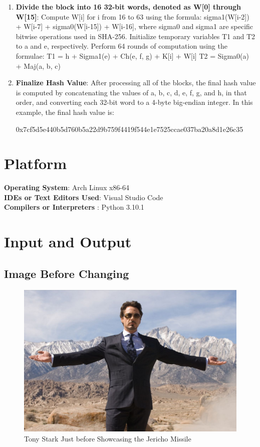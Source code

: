 \documentclass[openany]{book}
\begin{document}
\begin{enumerate}
    \item \textbf{Divide the block into 16 32-bit words, denoted as W[0] through W[15]}:
          Compute W[i] for i from 16 to 63 using the formula: sigma1(W[i-2]) + W[i-7] + sigma0(W[i-15]) + W[i-16], where sigma0 and sigma1 are specific bitwise operations used in SHA-256.
          Initialize temporary variables T1 and T2 to a and e, respectively.
          Perform 64 rounds of computation using the formulae:
          T1 = h + Sigma1(e) + Ch(e, f, g) + K[i] + W[i]
          T2 = Sigma0(a) + Maj(a, b, c)

    \item \textbf{Finalize Hash Value}: After processing all of the blocks, the final hash value is computed by concatenating the values of a, b, c, d, e, f, g, and h, in that order, and converting each 32-bit word to a 4-byte big-endian integer. In this example, the final hash value is:

          0x7cf5d5e440b5d760b5a22d9b759f4419f544e1e7525ccae037ba20a8d1e26c35
\end{enumerate}


\section{Platform}
\textbf{\textbf{Operating System}}: Arch Linux x86-64 \\
\textbf{\textbf{IDEs or Text Editors Used}}: Visual Studio Code\\
\textbf{\textbf{Compilers or Interpreters} }: Python 3.10.1\\

\section{Input and Output}

\subsection*{Image Before Changing}
\begin{figure}[H]
    \centering
    \includegraphics[width=.90\textwidth]{tony.jpg}
    \caption{Tony Stark Just before Showcasing the Jericho Missile}
\end{figure}
\end{document}
